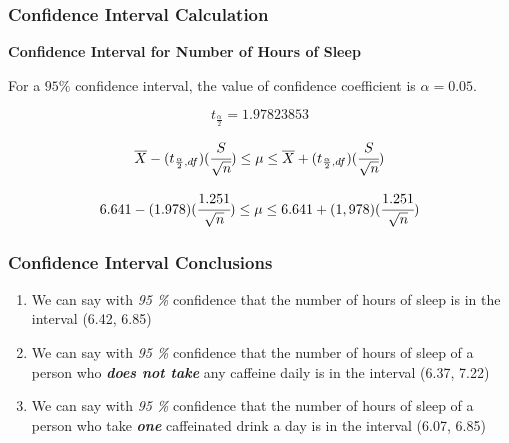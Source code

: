 \documentclass[11pt,]{beamer}
\begin{document}
\begin{frame}

    \frametitle{Confidence Interval Calculation}
    
        \textbf{Confidence Interval for Number of Hours of Sleep}
        
        For a $95 \%$ confidence interval, the value of confidence coefficient is $\alpha = 0.05$. 
        
        \begin{equation}
            t_{\frac{\alpha}{2}} = 1.97823853 
        \end{equation}
        
        \begin{equation}
            \overline{X} - (t_{\frac{\alpha}{2}, df})(\cfrac{S}{\sqrt{n}}) \leq \mu \leq \overline{X} + (t_{\frac{\alpha}{2}, df})(\cfrac{S}{\sqrt{n}})
        \end{equation}
        
        \begin{equation}
            6.641 - (1.978)(\cfrac{1.251}{\sqrt{n}}) \leq \mu \leq 6.641 + (1,978)(\cfrac{1.251}{\sqrt{n}})
        \end{equation}
    
\end{frame}

\begin{frame}

	\frametitle{Confidence Interval Conclusions}

    \begin{enumerate}
        
        \item{We can say with \textit{95 \%} confidence that the number of hours of sleep is in the interval (6.42, 6.85)}
        
        \bigskip
        
        \item{We can say with \textit{95 \%} confidence that the number of hours of sleep of a person who \emph{\textbf{does not take}} any caffeine daily is in the interval (6.37, 7.22)}
        
        \bigskip
        
        \item{We can say with \textit{95 \%} confidence that the number of hours of sleep of a person who take \emph{\textbf{one}} caffeinated drink a day is in the interval (6.07, 6.85)}
        
    \end{enumerate}
    
\end{frame}
\end{document}
